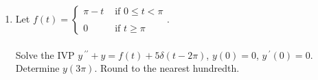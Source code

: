 \documentclass{ximera}
\begin{document}
\begin{enumerate}[label=(\arabic*)]
    Hint:  Let $y(t)$ be the fraction of the community population that has heard the news by $t\geq 0$ hours after 8:00 AM.
















\item Let {\large$f(t)=\left\{\begin{array}{lr}
       \pi-t & \mbox{ if }0\leq t<\pi\\
       \\
       0 &  \mbox{ if }t\geq \pi
     \end{array}\right..$} \\ \\ Solve the IVP {\large$y\,^{\prime\prime}+y=f(t)+5\delta(t-2\pi)$, \hspace{0.25cm} $y(0)=0$, $y\,^{\prime}(0)=0$}.  Determine $y(3\pi)$.  Round to the nearest hundredth.




\end{enumerate}
\end{document}
